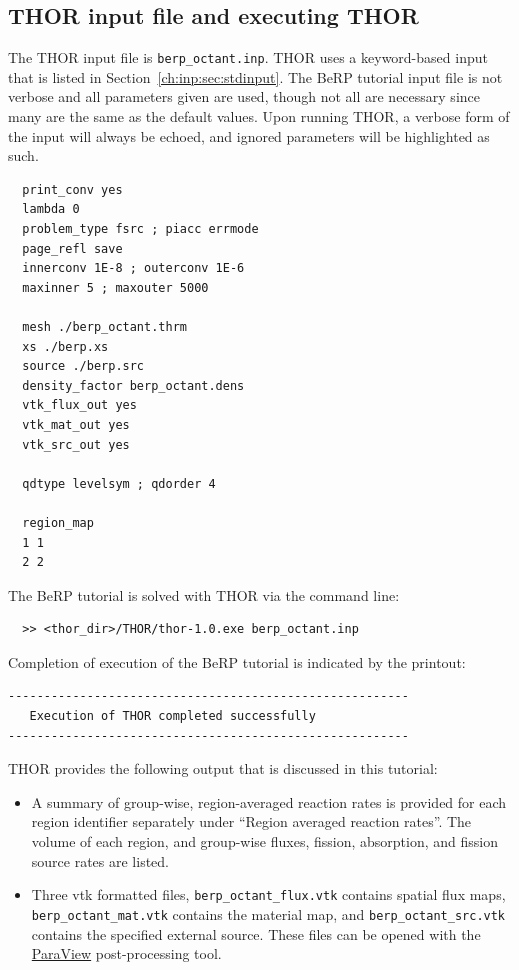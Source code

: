 \subsection{THOR input file and executing THOR}

The \ac{THOR} input file is \verb"berp_octant.inp".
\ac{THOR} uses a keyword-based input that is listed in Section~\ref{ch:inp:sec:stdinput}.
The BeRP tutorial input file is not verbose and all parameters given are used, though not all are necessary since many are the same as the default values.
Upon running \ac{THOR}, a verbose form of the input will always be echoed, and ignored parameters will be highlighted as such.
\begin{verbatim}
  print_conv yes
  lambda 0
  problem_type fsrc ; piacc errmode
  page_refl save
  innerconv 1E-8 ; outerconv 1E-6
  maxinner 5 ; maxouter 5000

  mesh ./berp_octant.thrm
  xs ./berp.xs
  source ./berp.src
  density_factor berp_octant.dens
  vtk_flux_out yes
  vtk_mat_out yes
  vtk_src_out yes

  qdtype levelsym ; qdorder 4

  region_map
  1 1
  2 2
\end{verbatim}

The BeRP tutorial is solved with \ac{THOR} via the command line:
\begin{verbatim}
  >> <thor_dir>/THOR/thor-1.0.exe berp_octant.inp
\end{verbatim}

Completion of execution of the BeRP tutorial is indicated by the printout:
\begin{verbatim}
--------------------------------------------------------
   Execution of THOR completed successfully
--------------------------------------------------------
\end{verbatim}

\ac{THOR} provides the following output that is discussed in this tutorial:
\begin{itemize}
    \item A summary of group-wise, region-averaged reaction rates is provided for each region identifier separately under ``Region averaged reaction rates''.
    The volume of each region, and group-wise fluxes, fission, absorption, and fission source rates are listed.
    \item Three vtk formatted files, \verb"berp_octant_flux.vtk" contains spatial flux maps, \\
    \verb"berp_octant_mat.vtk" contains the material map, and \verb"berp_octant_src.vtk" contains the specified external source.
    These files can be opened with the \href{https://www.paraview.org/download/}{ParaView} post-processing tool.
\end{itemize}

